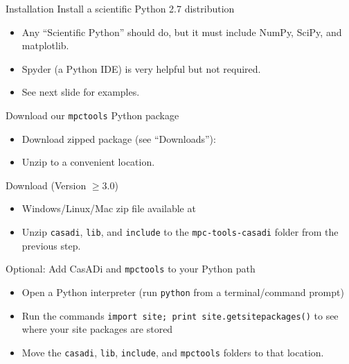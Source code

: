 \documentclass[xcolor=dvipsnames]{beamer}
\begin{document}
%
\begin{frame}[allowframebreaks]{Installation}
    Install a scientific Python 2.7 distribution
    \begin{itemize}
        \item Any ``Scientific Python'' should do, but it must include NumPy, SciPy, and matplotlib.
        \item Spyder (a Python IDE) is very helpful but not required.
        \item See next slide for examples.
    \end{itemize}
    
    \medskip
    
    Download our \texttt{mpctools} Python package
    \begin{itemize}
        \item Download zipped package (see ``Downloads''): 
        \item Unzip to a convenient location.
    \end{itemize}
    
    \framebreak
    
    Download \casadi{} (Version $\ge$3.0)
    \begin{itemize}
        \item Windows/Linux/Mac zip file available at 
        \item Unzip \texttt{casadi}, \texttt{lib}, and \texttt{include} to the \texttt{mpc-tools-casadi} folder from the previous step.
    \end{itemize}
    
    \medskip
    
    Optional: Add CasADi and \texttt{mpctools} to your Python path
    \begin{itemize}
        \item Open a Python interpreter (run \lstinline[style=shell]!python! from a terminal/command prompt)
        \item Run the commands \lstinline[style=python]!import site; print site.getsitepackages()! to see where your site packages are stored
        \item Move the \texttt{casadi}, \texttt{lib}, \texttt{include}, and \texttt{mpctools} folders to that location.
    \end{itemize}
\end{frame}
\end{document}

